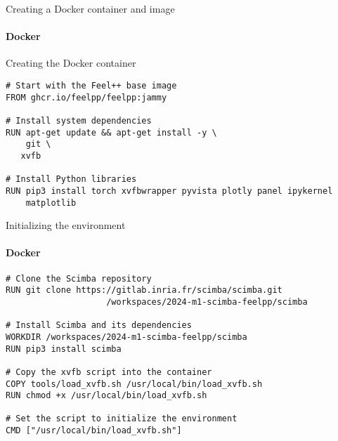 \documentclass{beamer}
\begin{document}
\begin{frame}[fragile]{Creating a Docker container and image}
\framesubtitle{Docker}

Creating the Docker container

\begin{lstlisting}[language=docker,caption={Dockerfile for Feel++, Scimba, and Python libraries.},frame=single, backgroundcolor=\color{gray!10}, basicstyle=\footnotesize,rulecolor=\color{blue}, framexleftmargin=3pt, commentstyle=\color{mygreen}, keywordstyle=\color{blue}]
# Start with the Feel++ base image
FROM ghcr.io/feelpp/feelpp:jammy

# Install system dependencies
RUN apt-get update && apt-get install -y \
    git \
   xvfb

# Install Python libraries
RUN pip3 install torch xvfbwrapper pyvista plotly panel ipykernel
    matplotlib
\end{lstlisting}

\end{frame}
\begin{comment}

    It copies the public ScimBa repository into the {scimba} folder and installs it.
    
    We have also built the necessary environment to run Feel++ libraries to solve a Laplacian problem and generate visuals.
    
     
\end{comment}

\begin{frame}[fragile]{Initializing the environment}
\framesubtitle{Docker}

\begin{lstlisting}[language=docker,caption={Dockerfile for Feel++, Scimba, and Python libraries.},frame=single, backgroundcolor=\color{gray!10}, basicstyle=\footnotesize,rulecolor=\color{blue}, framexleftmargin=3pt, commentstyle=\color{mygreen}, keywordstyle=\color{blue}]
# Clone the Scimba repository
RUN git clone https://gitlab.inria.fr/scimba/scimba.git 
                    /workspaces/2024-m1-scimba-feelpp/scimba

# Install Scimba and its dependencies
WORKDIR /workspaces/2024-m1-scimba-feelpp/scimba
RUN pip3 install scimba

# Copy the xvfb script into the container
COPY tools/load_xvfb.sh /usr/local/bin/load_xvfb.sh
RUN chmod +x /usr/local/bin/load_xvfb.sh

# Set the script to initialize the environment
CMD ["/usr/local/bin/load_xvfb.sh"]

\end{lstlisting}
\end{frame}
\end{document}
